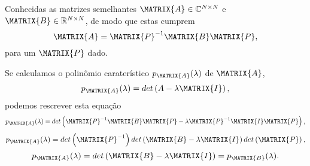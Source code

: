 \begin{myproofT}\label{proof:theo:similhante1}
Conhecidas as matrizes semelhantes $\MATRIX{A} \in \mathbb{C}^{N \times N}$ e $\MATRIX{B} \in \mathbb{R}^{N \times N}$,
de modo que estas cumprem 
\begin{equation}
\MATRIX{A} = \MATRIX{P}^{-1} \MATRIX{B} \MATRIX{P},
\end{equation}
para um $\MATRIX{P}$ dado.

Se calculamos o polinômio caraterístico $p_{\MATRIX{A}}(\lambda)$ de $\MATRIX{A}$,
\begin{equation}
p_{\MATRIX{A}}(\lambda)=det\left(A-\lambda \MATRIX{I}\right),
\end{equation}
podemos rescrever esta equação
\begin{equation}
p_{\MATRIX{A}}(\lambda)=det\left(\MATRIX{P}^{-1} \MATRIX{B} \MATRIX{P}-\lambda \MATRIX{P}^{-1} \MATRIX{I} \MATRIX{P} \right),
\end{equation}
\begin{equation}
p_{\MATRIX{A}}(\lambda)=det\left( \MATRIX{P}^{-1}\right)det\left( \MATRIX{B} -\lambda \MATRIX{I} \right)det\left( \MATRIX{P}\right),
\end{equation}
\begin{equation}
p_{\MATRIX{A}}(\lambda)=det\left( \MATRIX{B} -\lambda \MATRIX{I} \right) = p_{\MATRIX{B}}(\lambda).
\end{equation}
\end{myproofT}

